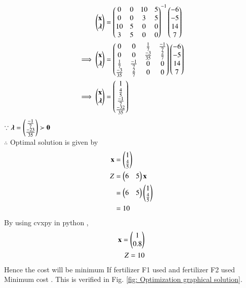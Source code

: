 \documentclass[journal,12pt,twocolumn]{IEEEtran}
\begin{document}
\begin{align}
    \begin{pmatrix}\mathbf{x} \\ \boldsymbol{\lambda}\end{pmatrix} &= \begin{pmatrix}0 & 0 & 10 & 5 \\ 0 & 0 & 3 & 5 \\ 10 & 5 & 0 & 0 \\ 3 & 5 & 0 & 0\end{pmatrix}^{-1}\begin{pmatrix}-6 \\ -5 \\ 14 \\ 7\end{pmatrix}
    \\
    \implies   \begin{pmatrix}\mathbf{x} \\ \boldsymbol{\lambda}\end{pmatrix} &= \begin{pmatrix}0 & 0 & \frac{1}{7} & \frac{-1}{7} \\ 0 & 0 & \frac{-3}{35} & \frac{2}{7} \\ \frac{1}{7} & \frac{-1}{7} & 0 & 0 \\ \frac{-3}{35} & \frac{2}{7} & 0 & 0\end{pmatrix}\begin{pmatrix}-6 \\ -5 \\ 14 \\ 7\end{pmatrix}
    \\
    \implies \begin{pmatrix}\mathbf{x} \\ \boldsymbol{\lambda}\end{pmatrix} &= \begin{pmatrix}1 \\ \frac{4}{5} \\ \frac{-1}{7} \\ \frac{-32}{35} \end{pmatrix}
\end{align}
$\because \boldsymbol{\lambda}=\begin{pmatrix}\frac{-1}{7} \\ \frac{-23}{35}\end{pmatrix} \succ \mathbf{0} $ 
\\
$\therefore$ Optimal solution is given by
\begin{align}
    \mathbf{x} &= \begin{pmatrix}1\\\frac{4}{5}\end{pmatrix} \\
    Z &= \begin{pmatrix}6 & 5\end{pmatrix}\mathbf{x} \\
    &= \begin{pmatrix}6 & 5\end{pmatrix}\begin{pmatrix}1 \\\frac{4}{5} \end{pmatrix} \\
    &= 10
\end{align}
By using cvxpy in python ,
\begin{align}
    \mathbf{x}=\begin{pmatrix}1\\0.8\end{pmatrix}\\
    Z = 10
\end{align}
Hence the cost will be minimum If fertilizer F1 used   and fertilizer F2 used   \\ Minimum cost   .  This
is verified in Fig. \ref{fig: Optimization graphical solution}.	
%
\end{document}
